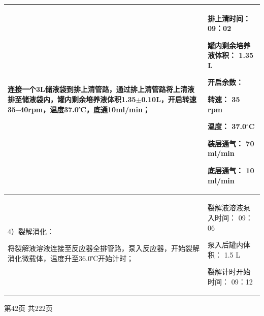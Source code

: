 \documentclass[UTF8,10pt,a4paper,fontset=fandol]{ctexart}
\newcommand{\fieldvalue}[1]{#1}
\newcommand{\handwritten}[1]{#1}
\begin{document}
\begin{tabularx}{\textwidth}{|p{}|X|}
\begin{minipage}[t]{0.49\textwidth}
连接一个3L储液袋到排上清管路，通过排上清管路将上清液排至储液袋内，罐内剩余培养液体积1.35$\pm$0.10L，开启转速35--40rpm，温度37.0℃，底通10ml/min；
\end{minipage}
&
\begin{minipage}[t]{0.40\textwidth}
排上清时间：
\fieldvalue{\handwritten{09：02}}

罐内剩余培养液体积：
\fieldvalue{\handwritten{1.35}} L

开启余数：

转速：
\fieldvalue{\handwritten{35}} rpm

温度：
\fieldvalue{\handwritten{37.0}}${}^{\circ}$C

装层通气：
\fieldvalue{\handwritten{70}} ml/min

底层通气：
\fieldvalue{\handwritten{10}} ml/min
\end{minipage}
\\
\hline
\begin{minipage}[t]{0.49\textwidth}
4）裂解消化：

将裂解液溶液连接至反应器全排管路，泵入反应器，开始裂解消化微载体，温度升至36.0℃开始计时；
\end{minipage}
&
\begin{minipage}[t]{0.40\textwidth}
裂解液溶液泵入时间：
\fieldvalue{\handwritten{09：06}}

泵入后罐内体积：
\fieldvalue{\handwritten{1.5}} L

裂解计时开始时间：
\fieldvalue{\handwritten{09：12}}
\end{minipage}
\\
\hline
\end{tabularx}

\begin{center}
第42页 共222页
\end{center}

\end{document}
